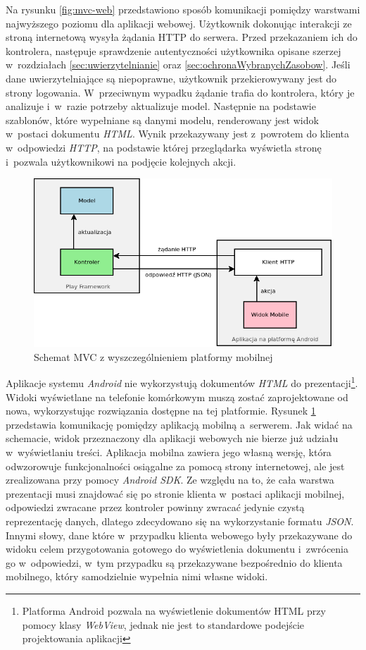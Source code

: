 \documentclass[11pt]{aghdpl}
\begin{document}
Na rysunku \ref{fig:mvc-web} przedstawiono sposób komunikacji pomiędzy warstwami najwyższego poziomu dla aplikacji webowej. Użytkownik dokonując interakcji ze stroną internetową wysyła żądania HTTP do serwera. Przed przekazaniem ich do kontrolera, następuje sprawdzenie autentyczności użytkownika opisane szerzej w~rozdziałach \ref{sec:uwierzytelnianie} oraz \ref{sec:ochronaWybranychZasobow}. Jeśli dane uwierzytelniające są niepoprawne, użytkownik przekierowywany jest do strony logowania. W~przeciwnym wypadku żądanie trafia do kontrolera, który je analizuje i~w~razie potrzeby aktualizuje model. Następnie na podstawie szablonów, które wypełniane są danymi modelu, renderowany jest widok w~postaci dokumentu \emph{HTML}. Wynik przekazywany jest z~powrotem do klienta w~odpowiedzi \emph{HTTP}, na podstawie której przeglądarka wyświetla stronę i~pozwala użytkownikowi na podjęcie kolejnych akcji.

\begin{figure}[h!]
	\centering
	\includegraphics[width=\linewidth * 4/5]{MVC-MOBILE}
	\caption{Schemat MVC z wyszczególnieniem platformy mobilnej}
	\label{fig:mvc-mobile}
\end{figure}

Aplikacje systemu \emph{Android} nie wykorzystują dokumentów \emph{HTML} do prezentacji\footnote{Platforma Android pozwala na wyświetlenie dokumentów HTML przy pomocy klasy \emph{WebView}, jednak nie jest to standardowe podejście projektowania aplikacji}. Widoki wyświetlane na telefonie komórkowym muszą zostać zaprojektowane od nowa, wykorzystując rozwiązania dostępne na tej platformie. Rysunek \ref{fig:mvc-mobile} przedstawia komunikację pomiędzy aplikacją mobilną a~serwerem. Jak widać na schemacie, widok przeznaczony dla aplikacji webowych nie bierze już udziału w~wyświetlaniu treści. Aplikacja mobilna zawiera jego własną wersję, która odwzorowuje funkcjonalności osiągalne za pomocą strony internetowej, ale jest zrealizowana przy pomocy \emph{Android SDK}. Ze względu na to, że cała warstwa prezentacji musi znajdować się po stronie klienta w~postaci aplikacji mobilnej, odpowiedzi zwracane przez kontroler powinny zwracać jedynie czystą reprezentację danych, dlatego zdecydowano się na wykorzystanie formatu \emph{JSON}. Innymi słowy, dane które w~przypadku klienta webowego były przekazywane do widoku celem przygotowania gotowego do wyświetlenia dokumentu i~zwrócenia go w~odpowiedzi, w~tym przypadku są przekazywane bezpośrednio do klienta mobilnego, który samodzielnie wypełnia nimi własne widoki.
\end{document}
